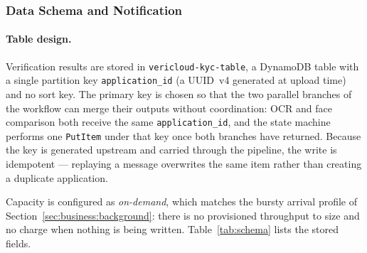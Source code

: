 \subsubsection{Data Schema and Notification}\label{sec:data}

\paragraph{Table design.}
Verification results are stored in \texttt{vericloud-kyc-table}, a DynamoDB table
with a single partition key \texttt{application\_id} (a UUID~v4 generated at
upload time) and no sort key. The primary key is chosen so that the two parallel
branches of the workflow can merge their outputs without coordination: OCR and
face comparison both receive the same \texttt{application\_id}, and the state
machine performs one \texttt{PutItem} under that key once both branches have
returned. Because the key is generated upstream and carried through the
pipeline, the write is idempotent --- replaying a message overwrites the same
item rather than creating a duplicate application.

Capacity is configured as \emph{on-demand}, which matches the bursty arrival
profile of Section~\ref{sec:business:background}: there is no provisioned
throughput to size and no charge when nothing is being written. Table~\ref{tab:schema}
lists the stored fields.


